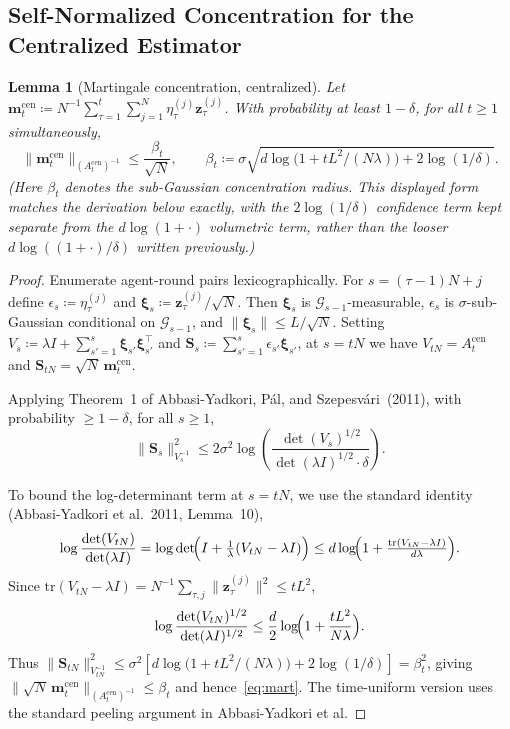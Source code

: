 \documentclass[11pt]{article}
\newtheorem{lemma}[theorem]{Lemma}
\begin{document}
\subsection{Self-Normalized Concentration for the Centralized Estimator}

\begin{lemma}[Martingale concentration, centralized]\label{lem:mart}
Let $\bm{m}_t^{\mathrm{cen}}\coloneqq
N^{-1}\sum_{\tau=1}^t\sum_{j=1}^N\eta_\tau^{(j)}\bm{z}_\tau^{(j)}$.
With probability at least $1-\delta$, for all $t\geq 1$
simultaneously,
\begin{equation}
\|\bm{m}_t^{\mathrm{cen}}\|_{(A_t^{\mathrm{cen}})^{-1}}
\leq\frac{\beta_t}{\sqrt{N}},
\qquad
\beta_t\coloneqq\sigma\sqrt{d\log\!\bigl(1+tL^2/(N\lambda)\bigr)+2\log(1/\delta)}.
\label{eq:mart}
\end{equation}
(Here $\beta_t$ denotes the sub-Gaussian concentration radius. This
displayed form matches the derivation below exactly, with the
$2\log(1/\delta)$ confidence term kept separate from the
$d\log(1+\cdot)$ volumetric term, rather than the looser
$d\log((1+\cdot)/\delta)$ written previously.)
\end{lemma}

\begin{proof}
Enumerate agent-round pairs lexicographically. For $s=(\tau-1)N+j$ define
$\epsilon_s\coloneqq\eta_\tau^{(j)}$
and $\bm{\xi}_s\coloneqq\bm{z}_\tau^{(j)}/\sqrt{N}$.
Then $\bm{\xi}_s$ is $\mathcal{G}_{s-1}$-measurable,
$\epsilon_s$ is $\sigma$-sub-Gaussian conditional on $\mathcal{G}_{s-1}$,
and $\|\bm{\xi}_s\|\leq L/\sqrt{N}$.
Setting $V_s\coloneqq\lambda I+\sum_{s'=1}^s\bm{\xi}_{s'}\bm{\xi}_{s'}^\top$
and $\bm{S}_s\coloneqq\sum_{s'=1}^s\epsilon_{s'}\bm{\xi}_{s'}$,
at $s=tN$ we have $V_{tN}=A_t^{\mathrm{cen}}$ and
$\bm{S}_{tN}=\sqrt{N}\,\bm{m}_t^{\mathrm{cen}}$.

Applying Theorem~1 of Abbasi-Yadkori, P\'al, and Szepesv\'ari~(2011),
with probability $\geq 1-\delta$, for all $s\geq 1$,
\[
\|\bm{S}_s\|_{V_s^{-1}}^2
\leq 2\sigma^2\log\!\left(\frac{\det(V_s)^{1/2}}
{\det(\lambda I)^{1/2}\cdot\delta}\right).
\]

To bound the log-determinant term at $s=tN$, we use the standard
identity (Abbasi-Yadkori et al.\ 2011, Lemma~10),
\[
\log\frac{\det(V_{tN})}{\det(\lambda I)}
=\log\det\!\Bigl(I+\tfrac{1}{\lambda}(V_{tN}-\lambda I)\Bigr)
\leq d\log\!\Bigl(1+\tfrac{\mathrm{tr}(V_{tN}-\lambda I)}{d\lambda}\Bigr).
\]
Since $\mathrm{tr}(V_{tN}-\lambda I)=N^{-1}\sum_{\tau,j}\|\bm{z}_\tau^{(j)}\|^2\leq tL^2$,
\[
\log\frac{\det(V_{tN})^{1/2}}{\det(\lambda I)^{1/2}}
\leq\frac{d}{2}\log\!\Bigl(1+\frac{tL^2}{N\lambda}\Bigr).
\]
Thus $\|\bm{S}_{tN}\|_{V_{tN}^{-1}}^2\leq
\sigma^2\!\left[d\log\!\bigl(1+tL^2/(N\lambda)\bigr)+2\log(1/\delta)\right]
=\beta_t^2$,
giving $\|\sqrt{N}\,\bm{m}_t^{\mathrm{cen}}\|_{(A_t^{\mathrm{cen}})^{-1}}\leq\beta_t$
and hence~\eqref{eq:mart}.
The time-uniform version uses the standard peeling argument in
Abbasi-Yadkori et al.
\end{proof}
\end{document}
